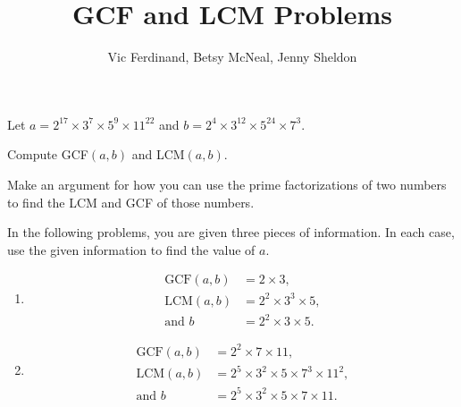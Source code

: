 \documentclass[nooutcomes]{ximera}
\title{GCF and LCM Problems}
\author{Vic Ferdinand, Betsy McNeal, Jenny Sheldon}
\begin{document}
\begin{abstract} \end{abstract}
\maketitle




\begin{problem} \label{GCFLCM1}

Let
$a = 2^{17}\times 3^7 \times 5^9 \times 11^{22}$ and $b =  2^{4}\times 3^{12} \times 5^{24} \times 7^{3}$.

Compute GCF$(a,b)$ and LCM$(a,b)$.

\end{problem}

\begin{problem}\label{GCFLCM2}
Make an argument for how you can use the prime factorizations of two
numbers to find the LCM and GCF of those numbers.
\end{problem}
\vfill
\newpage

\begin{problem} \label{GCFLCM3}
In the following problems, you are given three pieces of
information. In each case, use the given information to find the value
of $a$.

\begin{enumerate}
\item 
\begin{align*}
  \text{GCF}(a,b) &= 2 \times 3,\\ \text{LCM}(a,b) &= 2^2 \times
  3^3 \times 5,\\ \text{and } b &= 2^2 \times 3 \times 5.
\end{align*}

\vfill
\item  
\begin{align*}
  \text{GCF}(a,b) &= 2^2 \times 7 \times 11,\\
  \text{LCM}(a,b) &= 2^5 \times 3^2 \times 5 \times 7^3 \times 11^2,\\
  \text{and }   b &= 2^5 \times 3^2 \times 5 \times 7 \times 11.
\end{align*}
\vfill
\end{enumerate}
\end{problem}

\newpage
\end{document}
